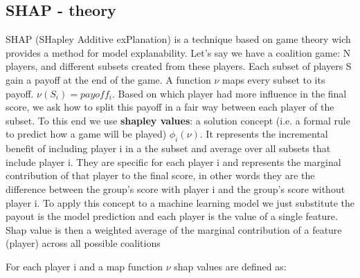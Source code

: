 \documentclass[a4paper,11pt]{article}
\begin{document}
\subsection{SHAP - theory}
SHAP (SHapley Additive exPlanation) is a technique based on game theory wich provides a method for model explanability.
Let's say we have a coalition game: N players, and different subsets created from these players. Each subset of players S gain a payoff at the end of the game. A function $\nu$ maps every subset to its payoff. $\nu(S_i) = payoff_i$. Based on which player had more influence in the final score, we ask how to split this payoff in a fair way between each player of the subset.
To this end we use \textbf{shapley values}: a solution concept (i.e. a formal rule to predict how a game will be played) $\phi_i(\nu)$. It represents the incremental benefit of including player i in a the subset and average over all subsets that include player i.
They are specific for each player i and represents the marginal contribution of that player to the final score, in other words they are the difference between the group's score with player i and the group's score without player i.
To apply this concept to a machine learning model we just substitute the payout is the model prediction and each player is the value of a single feature.
Shap value is then a weighted average of the marginal contribution of a feature (player) across all possible coalitions

For each player i and a map function $\nu$ shap values are defined as:
\end{document}
